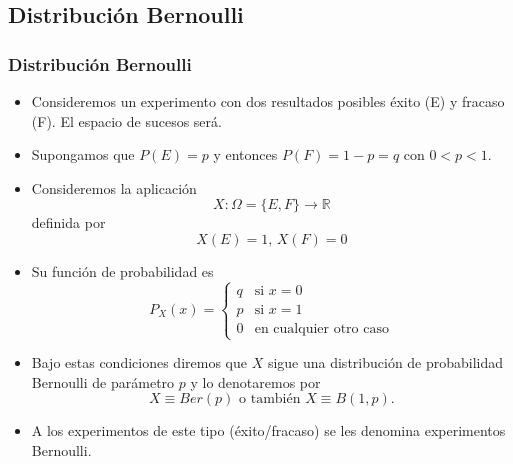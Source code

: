 \documentclass[handout]{beamer}\usepackage[]{graphicx}\usepackage[]{color}
\newcommand{\RR}{\mathbb{R}}
\renewcommand{\leq}{\leqslant}
\theoremstyle{plain}
\theoremstyle{definition}
\begin{document}
\subsection{Distribución Bernoulli}
\begin{frame}
\frametitle{Distribución Bernoulli}
\begin{itemize}
\item Consideremos un experimento con dos resultados posibles éxito (E) y
fracaso (F). El espacio de sucesos será.
\item Supongamos  que  $P(E)=p$ y entonces $P(F)=1-p=q$ con $0<p<1$.
\item Consideremos la  aplicación 
$$X:\Omega=\{E,F\}\to \RR$$
definida por
$$X(E)=1\mbox{, }X(F)=0$$
\item Su  función de probabilidad es
$$
P_{X}(x)=
\left\{
\begin{array}{ll} q & \mbox{si } x=0\\
p & \mbox{si } x=1\\
0 & \mbox{en cualquier otro caso}
\end{array}
\right.
$$
\end{itemize}
\end{frame}


\begin{frame}[fragile]
\begin{itemize}
\item Bajo estas condiciones diremos que $X$ sigue una distribución de
probabilidad  Bernoulli de parámetro $p$ y lo denotaremos por
$$X\equiv Ber(p)\mbox{ o también } X\equiv B(1,p).$$
\item A los experimentos de este tipo (éxito/fracaso)
    se les denomina experimentos Bernoulli.
\end{itemize}
\end{frame}
% 
% 
% 
\end{document}
